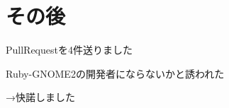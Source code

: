 \section{その後}

\begin{frame}
\begin{itemize}
{\Large
\item PullRequestを4件送りました
\item Ruby-GNOME2の開発者にならないかと誘われた
}
\end{itemize}
{\Huge
→快諾しました
}
\end{frame}

